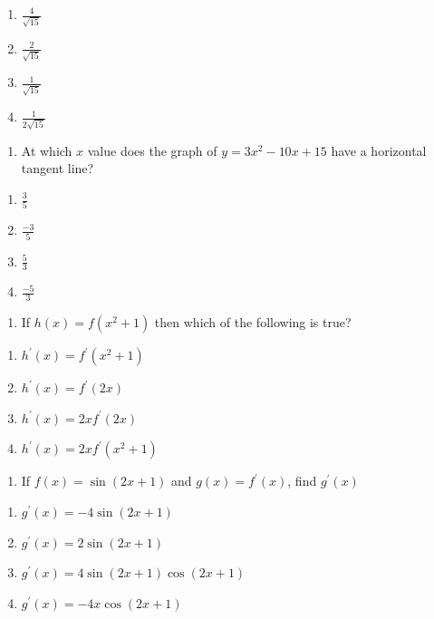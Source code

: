 \begin{enumerate}
\def\labelenumi{(\Alph{enumi})}
\item
  \(\frac{4}{\sqrt{15}}\)
\item
  \(\frac{2}{\sqrt{15}}\)
\item
  \(\frac{1}{\sqrt{15}}\)
\item
  \(\frac{1}{2 \sqrt{15}}\)
\end{enumerate}

\begin{enumerate}
\def\labelenumi{\arabic{enumi}.}
\setcounter{enumi}{8}
\tightlist
\item
  At which \(x\) value does the graph of \(y=3 x^{2}-10 x+15\) have a
  horizontal tangent line?
\end{enumerate}

\begin{enumerate}
\def\labelenumi{(\Alph{enumi})}
\item
  \(\frac{3}{5}\)
\item
  \(\frac{-3}{5}\)
\item
  \(\frac{5}{3}\)
\item
  \(\frac{-5}{3}\)
\end{enumerate}

\begin{enumerate}
\def\labelenumi{\arabic{enumi}.}
\tightlist
\item
  If \(h(x)=f\left(x^{2}+1\right)\) then which of the following is true?
\end{enumerate}

\begin{enumerate}
\def\labelenumi{(\Alph{enumi})}
\item
  \(h^{\prime}(x)=f^{\prime}\left(x^{2}+1\right)\)
\item
  \(h^{\prime}(x)=f^{\prime}(2 x)\)
\item
  \(h^{\prime}(x)=2 x f^{\prime}(2 x)\)
\item
  \(h^{\prime}(x)=2 x f^{\prime}\left(x^{2}+1\right)\)
\end{enumerate}

\begin{enumerate}
\def\labelenumi{\arabic{enumi}.}
\tightlist
\item
  If \(f(x)=\sin \left(2x +1\right)\) and \(g(x) = f^{\prime}(x)\), find
  \(g^{\prime}(x)\)
\end{enumerate}

\begin{enumerate}
\def\labelenumi{(\Alph{enumi})}
\item
  \(g^{\prime}(x) = -4 \sin (2x + 1)\)
\item
  \(g^{\prime}(x) = 2 \sin (2x + 1)\)
\item
  \(g^{\prime}(x) = 4 \sin(2x + 1) \cos(2x + 1)\)
\item
  \(g^{\prime}(x) = -4x \cos(2x + 1)\)
\end{enumerate}


